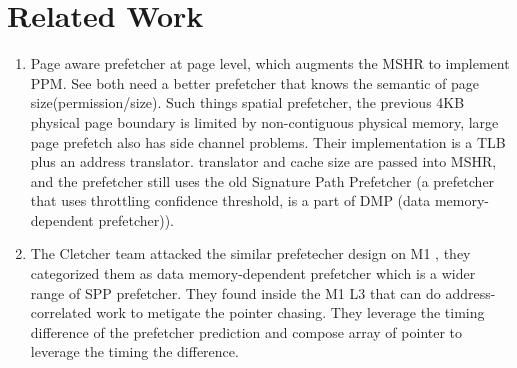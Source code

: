 \documentclass[letterpaper,12pt]{article}
\begin{document}
\section{Related Work}
\begin{enumerate}
  \item Page aware prefetcher \cite{vavouliotis2022page} at page level, which augments the MSHR to implement PPM. See both need a better prefetcher that knows the semantic of page size(permission/size). Such things spatial prefetcher, the previous 4KB physical page boundary is limited by non-contiguous physical memory, large page prefetch also has side channel problems. Their implementation is a TLB plus an address translator. translator and cache size are passed into MSHR, and the prefetcher still uses the old Signature Path Prefetcher (a prefetcher that uses throttling confidence threshold, is a part of DMP (data memory-dependent prefetcher)).
  \item The Cletcher team attacked the similar prefetecher design on M1 \cite{augury}, they categorized them as data memory-dependent prefetcher which is a wider range of SPP prefetcher. They found inside the M1 L3 that can do address-correlated work to metigate the pointer chasing. They leverage the timing difference of the prefetcher prediction and compose array of pointer to leverage the timing the difference.
\end{enumerate}


\end{document}
